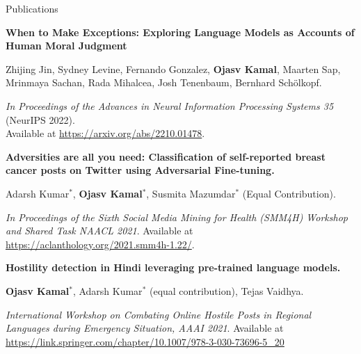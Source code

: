 \documentclass{resume} %
\begin{document}
\begin{rSection}{Publications} \itemsep -2pt
    \begin{etaremune}[start  = 3] %
       \item \textbf{When to Make Exceptions: Exploring Language Models as Accounts of Human Moral Judgment
       }
       
       Zhijing Jin, Sydney Levine, Fernando Gonzalez, \textbf{Ojasv Kamal}, Maarten Sap, Mrinmaya Sachan, Rada Mihalcea, Josh Tenenbaum, Bernhard Schölkopf.
       
        \emph{In Proceedings of the Advances in Neural Information Processing Systems 35} (NeurIPS 2022). \\Available at 
        \url{https://arxiv.org/abs/2210.01478}.
    
       \item \textbf{Adversities are all you need: Classification of self-reported breast cancer posts on Twitter using Adversarial Fine-tuning.}
       
       Adarsh Kumar$^*$, \textbf{Ojasv Kamal$^*$}, Susmita Mazumdar$^*$ (Equal Contribution). 
       
       \emph{In Proceedings of the Sixth Social Media Mining for Health (SMM4H) Workshop and Shared Task NAACL 2021}. Available at \url{https://aclanthology.org/2021.smm4h-1.22/}.
       
       \item \textbf{Hostility detection in Hindi leveraging pre-trained language models.}
       
       \textbf{Ojasv Kamal$^*$}, Adarsh Kumar$^*$ (equal contribution), Tejas Vaidhya. 
       
       \emph{International Workshop on Combating Online Hostile Posts in Regional Languages during Emergency Situation, AAAI 2021}. Available at \url{https://link.springer.com/chapter/10.1007/978-3-030-73696-5_20}
       

      
    \end{etaremune}

    
    \end{rSection}
\end{document}
